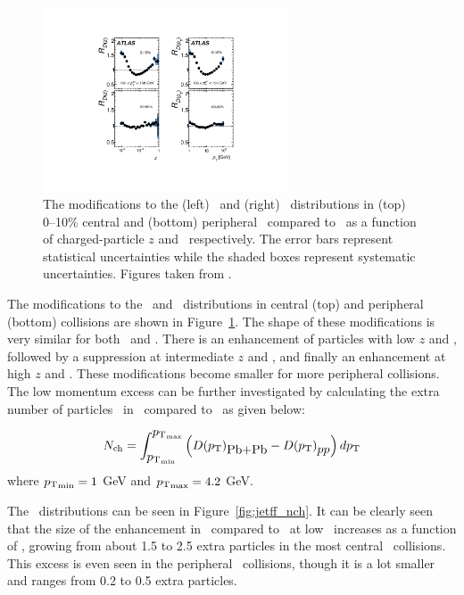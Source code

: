 \begin{figure}[htbp]
\begin{center}
\includegraphics[width=0.65\textwidth]{figures/jetMeasurements/jetff_rdz_rdpt}
\caption{The modifications to the (left) \Dz\ and (right) \Dpt\ distributions in (top) 0--10\% central and (bottom) peripheral \pbpb\ compared to \pp\ as a function of charged-particle $z$ and \pt\ respectively.
The error bars represent statistical uncertainties while the shaded boxes represent systematic uncertainties.
Figures taken from \cite{PhysRevC.98.024908}.}
\label{fig:jetff_rdz_rdpt}
\end{center}
\end{figure}

The modifications to the \Dz\ and \Dpt\ distributions in central (top) and peripheral (bottom) collisions are shown in Figure~\ref{fig:jetff_rdz_rdpt}.
The shape of these modifications is very similar for both \Dz\ and \Dpt.
There is an enhancement of particles with low $z$ and \pt, followed by a suppression at intermediate $z$ and \pt, and finally an enhancement at high $z$ and \pt.
These modifications become smaller for more peripheral collisions.
The low momentum excess can be further investigated by calculating the extra number of particles \Nch\ in \pbpb\ compared to \pp\ as given below:

\begin{align}
\mbox{$N_{\mathrm{ch}}$} = \int^{\mbox{$p_{\mathrm{T}}$}_{\mathrm{max}}}_{\mbox{$p_{\mathrm{T}}$}_{\mathrm{min}}} \left( \mbox{$D(\mbox{$p_{\mathrm{T}}$})$}_{\mbox{Pb+Pb}} - \mbox{$D(\mbox{$p_{\mathrm{T}}$})$}_{\mbox{$pp$}} \right) d\mbox{$p_{\mathrm{T}}$}
\end{align}
where $\mbox{$p_{\mathrm{T}}$}_{\mathrm{min}} = 1$ GeV and $\mbox{$p_{\mathrm{T}}$}_{\mathrm{max}} = 4.2$ GeV.

The \Nch\ distributions can be seen in Figure~\ref{fig:jetff_nch}.
It can be clearly seen that the size of the enhancement in \pp\ compared to \pp\ at low \pt\ increases as a function of \ptjet, growing from about 1.5 to 2.5 extra particles in the most central \pbpb\ collisions.
This excess is even seen in the peripheral \pbpb\ collisions, though it is a lot smaller and ranges from 0.2 to 0.5 extra particles.



